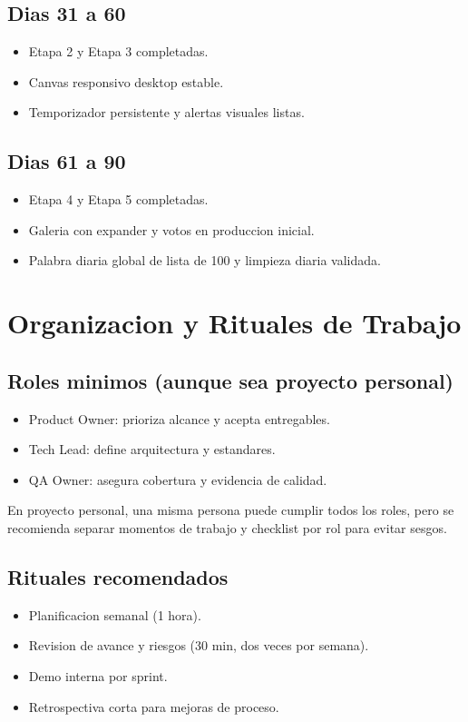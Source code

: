 \documentclass[12pt,a4paper]{article}
\begin{document}
\subsection{Dias 31 a 60}
\begin{itemize}
  \item Etapa 2 y Etapa 3 completadas.
  \item Canvas responsivo desktop estable.
  \item Temporizador persistente y alertas visuales listas.
\end{itemize}

\subsection{Dias 61 a 90}
\begin{itemize}
  \item Etapa 4 y Etapa 5 completadas.
  \item Galeria con expander y votos en produccion inicial.
  \item Palabra diaria global de lista de 100 y limpieza diaria validada.
\end{itemize}

\section{Organizacion y Rituales de Trabajo}
\subsection{Roles minimos (aunque sea proyecto personal)}
\begin{itemize}
  \item Product Owner: prioriza alcance y acepta entregables.
  \item Tech Lead: define arquitectura y estandares.
  \item QA Owner: asegura cobertura y evidencia de calidad.
\end{itemize}

En proyecto personal, una misma persona puede cumplir todos los roles, pero se recomienda separar momentos de trabajo y checklist por rol para evitar sesgos.

\subsection{Rituales recomendados}
\begin{itemize}
  \item Planificacion semanal (1 hora).
  \item Revision de avance y riesgos (30 min, dos veces por semana).
  \item Demo interna por sprint.
  \item Retrospectiva corta para mejoras de proceso.
\end{itemize}
\end{document}
